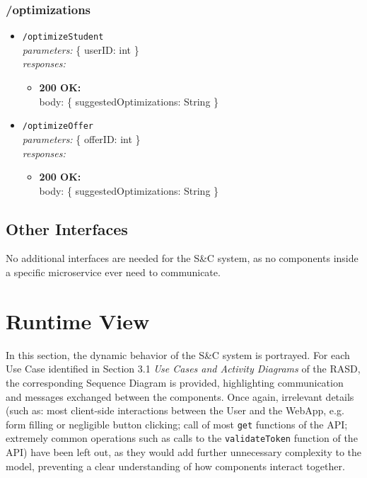 \subsubsection*{/optimizations}
\begin{itemize}
    \item \texttt{/optimizeStudent} \\
        \textit{parameters:} \{ userID: int \} \\
        \textit{responses:}
        \begin{itemize}
            \item \textbf{200 OK:} \\
            body: \{ suggestedOptimizations: String \}
        \end{itemize}
    \item \texttt{/optimizeOffer} \\
        \textit{parameters:} \{ offerID: int \} \\
        \textit{responses:}
        \begin{itemize}
            \item \textbf{200 OK:} \\
            body: \{ suggestedOptimizations: String \}
        \end{itemize}
\end{itemize}

\subsection{Other Interfaces}

No additional interfaces are needed for the S\&C system, as no components inside a specific microservice ever need to communicate.

\newpage

\section{Runtime View}
\label{sec:runtime_view}%
In this section, the dynamic behavior of the S\&C system is portrayed. For each Use Case identified in Section 3.1 \textit{Use Cases and Activity Diagrams} of the RASD, the corresponding Sequence Diagram is provided, highlighting communication and messages exchanged between the components.
Once again, irrelevant details (such as: most client-side interactions between the User and the WebApp, e.g. form filling or negligible button clicking; call of most \texttt{get} functions of the API; extremely common operations such as calls to the \texttt{validateToken} function of the API) have been left out, as they would add further unnecessary complexity to the model, preventing a clear understanding of how components interact together.

